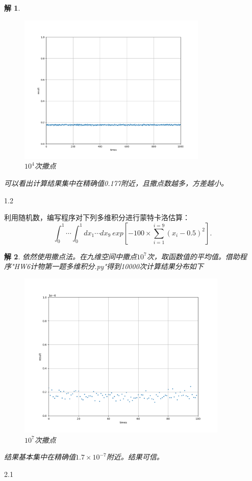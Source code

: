 \documentclass[10pt]{ctexart}
\newtheorem*{solution}{解}
\begin{document}
\begin{solution}
\begin{figure}[H]
        \includegraphics[width=9cm]{sprinkle_10000.png}
        \caption{$10^4$次撒点}
    \end{figure}
    可以看出计算结果集中在精确值0.177附近，且撒点数越多，方差越小。
\end{solution}
1.2

利用随机数，编写程序对下列多维积分进行蒙特卡洛估算：
$$\int_{0}^{1}\cdots\int_{0}^{1}dx_1\cdots dx_9\ exp\left [-100\times\sum\limits_{i=1}^{i=9}(x_i-0.5)^2\right ].$$
\begin{solution}
    依然使用撒点法。在九维空间中撒点$10^7$次，取函数值的平均值。借助程序"HW6计物第一题多维积分.py"得到10000次计算结果分布如下
    \begin{figure}[H]
        \centering
        \includegraphics[width=10cm]{HIghD_10000000.png}
        \caption{$10^7$次撒点}
    \end{figure}
结果基本集中在精确值$1.7\times 10^{-7}$附近。结果可信。
\end{solution}
2.1
\end{document}
